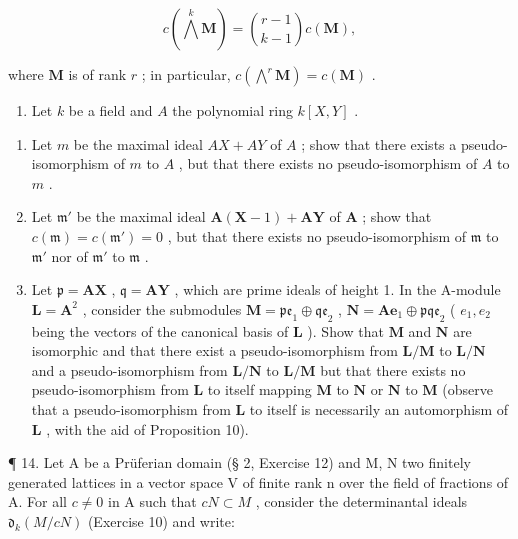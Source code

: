 \[
c \left(\bigwedge^ {k} \mathbf {M}\right) = \binom {r - 1} {k - 1} c (\mathbf {M}),
\]

where \(\mathbf{M}\) is of rank \(r\) ; in particular, \(c\left(\bigwedge^{r}\mathbf{M}\right) = c(\mathbf{M})\) .

\begin{enumerate}
\def\labelenumi{\arabic{enumi}.}
\setcounter{enumi}{12}
\tightlist
\item
  Let \(k\) be a field and \(A\) the polynomial ring \(k[X, Y]\) .
\end{enumerate}

\begin{enumerate}
\def\labelenumi{(\alph{enumi})}
\item
  Let \(m\) be the maximal ideal \(AX + AY\) of \(A\) ; show that there exists a pseudo-isomorphism of \(m\) to \(A\) , but that there exists no pseudo-isomorphism of \(A\) to \(m\) .
\item
  Let \(\mathfrak{m}'\) be the maximal ideal \(\mathbf{A}(\mathbf{X} - 1) + \mathbf{A}\mathbf{Y}\) of \(\mathbf{A}\) ; show that \(c(\mathfrak{m}) = c(\mathfrak{m}') = 0\) , but that there exists no pseudo-isomorphism of \(\mathfrak{m}\) to \(\mathfrak{m}'\) nor of \(\mathfrak{m}'\) to \(\mathfrak{m}\) .
\item
  Let \(\mathfrak{p} = \mathbf{AX}\) , \(\mathfrak{q} = \mathbf{AY}\) , which are prime ideals of height 1. In the A-module \(\mathbf{L} = \mathbf{A}^2\) , consider the submodules \(\mathbf{M} = \mathfrak{pe}_1 \oplus \mathfrak{qe}_2\) , \(\mathbf{N} = \mathbf{Ae}_1 \oplus \mathfrak{pqe}_2\) ( \(e_1, e_2\) being the vectors of the canonical basis of \(\mathbf{L}\) ). Show that \(\mathbf{M}\) and \(\mathbf{N}\) are isomorphic and that there exist a pseudo-isomorphism from \(\mathbf{L} / \mathbf{M}\) to \(\mathbf{L} / \mathbf{N}\) and a pseudo-isomorphism from \(\mathbf{L} / \mathbf{N}\) to \(\mathbf{L} / \mathbf{M}\) but that there exists no pseudo-isomorphism from \(\mathbf{L}\) to itself mapping \(\mathbf{M}\) to \(\mathbf{N}\) or \(\mathbf{N}\) to \(\mathbf{M}\) (observe that a pseudo-isomorphism from \(\mathbf{L}\) to itself is necessarily an automorphism of \(\mathbf{L}\) , with the aid of Proposition 10).
\end{enumerate}

¶ 14. Let A be a Prüferian domain (§ 2, Exercise 12) and M, N two finitely generated lattices in a vector space V of finite rank n over the field of fractions of A. For all \(c \neq 0\) in A such that \(cN \subset M\) , consider the determinantal ideals \(\mathfrak{d}_{k}(M/cN)\) (Exercise 10) and write:


